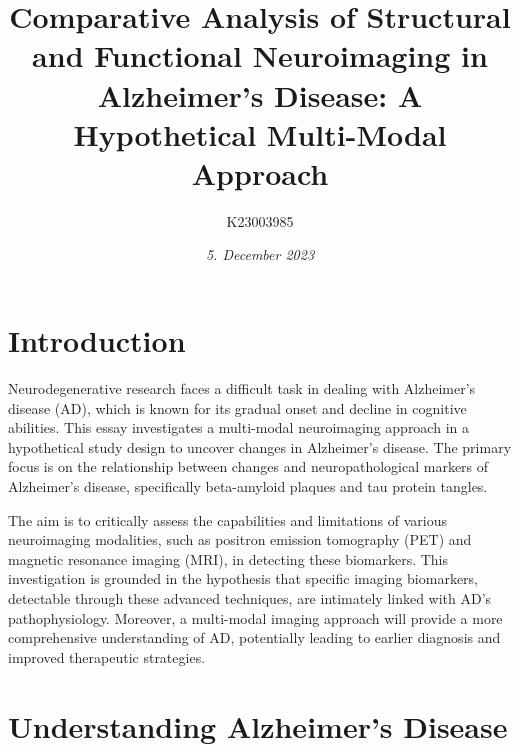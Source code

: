 \documentclass[10pt]{article}
\title{\textbf{Comparative Analysis of Structural and Functional Neuroimaging in Alzheimer's Disease: }A Hypothetical Multi-Modal Approach}
\author[ ]{K23003985}
\date{\textit{5. December 2023}}
\begin{document}

\maketitle

\doublespacing

\begin{sloppypar} %





  \section{Introduction}
  \label{sec:introduction}

  Neurodegenerative research faces a difficult task in dealing with Alzheimer's disease (AD), which is known for its gradual onset and decline in cognitive abilities. This essay investigates a multi-modal neuroimaging approach in a hypothetical study design to uncover changes in Alzheimer's disease. The primary focus is on the relationship between changes and neuropathological markers of Alzheimer's disease, specifically beta-amyloid plaques and tau protein tangles.

  The aim is to critically assess the capabilities and limitations of various neuroimaging modalities, such as positron emission tomography (PET) and magnetic resonance imaging (MRI), in detecting these biomarkers. This investigation is grounded in the hypothesis that specific imaging biomarkers, detectable through these advanced techniques, are intimately linked with AD's pathophysiology. Moreover, a multi-modal imaging approach will provide a more comprehensive understanding of AD, potentially leading to earlier diagnosis and improved therapeutic strategies.

  \section{Understanding Alzheimer's Disease}
  \label{sec:alzheimers-disease}


\end{sloppypar}
\end{document}
